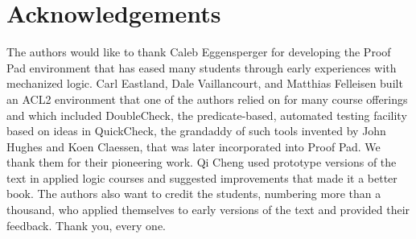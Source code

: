 \chapter{Acknowledgements}
\label{ch:Acknowledgements}

The authors would like to thank Caleb Eggensperger for developing
the Proof Pad environment that has eased many students 
through early experiences with mechanized logic. 
Carl Eastland, Dale Vaillancourt, and Matthias Felleisen 
built an ACL2 environment that one of the authors relied on 
for many course offerings and which
included DoubleCheck, the predicate-based, automated testing facility 
based on ideas in QuickCheck, the grandaddy 
of such tools invented by John Hughes and Koen Claessen,
that was later incorporated into Proof Pad. 
We thank them for their pioneering work.
Qi Cheng used prototype versions of the text
in applied logic courses and
suggested improvements that made it a better book.
The authors also want to credit the students, 
numbering more than a thousand,
who applied themselves to early versions of the
text and provided their feedback. Thank you, every one.

